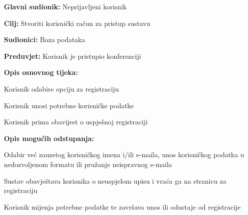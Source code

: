 					\noindent {}
					\begin{packed_item}
					
						\item \textbf{Glavni sudionik: } Neprijavljeni korisnik
						\item  \textbf{Cilj:} Stvoriti korisnički račun za pristup sustavu
						\item  \textbf{Sudionici:} Baza podataka
						\item  \textbf{Preduvjet:} Korisnik je pristupio konferenciji 
						\item  \textbf{Opis osnovnog tijeka:}
						
						\item[] \begin{packed_enum}
							
							\item Korisnik odabire opciju za registraciju
							\item Korisnik unosi potrebne korisničke podatke
							\item Korisnik prima obavijest o uspješnoj registraciji

						\end{packed_enum}
						
						\item  \textbf{Opis mogućih odstupanja:}
						
						\item[] \begin{packed_item}
							
							\item[2.a] Odabir već zauzetog korisničkog imena i/ili e-maila, unos korisničkog podatka u nedozvoljenom formatu ili pružanje neispravnog e-maila
							\item[] \begin{packed_enum}
								
								\item Sustav obavještava korisnika o neuspjelom upisu i vraća ga na stranicu za registraciju
								\item Korisnik mijenja potrebne podatke te završava unos ili odustaje od registracije
								
							\end{packed_enum}
							
						\end{packed_item}
					\end{packed_item}	
				
